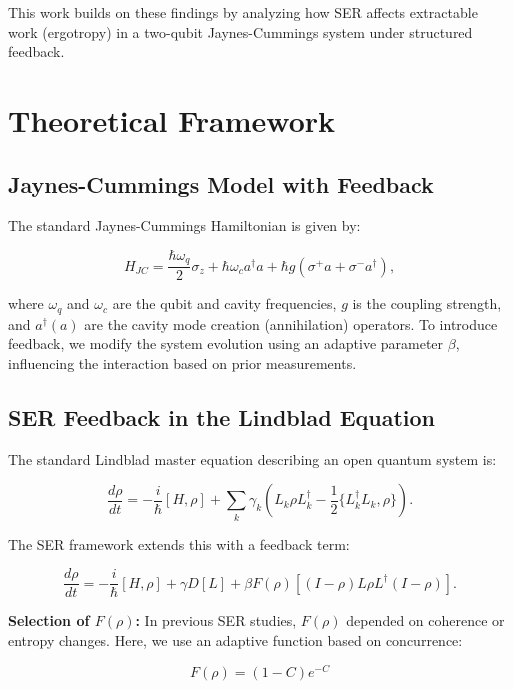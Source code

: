 \documentclass[12pt]{article}
\begin{document}
This work builds on these findings by analyzing how SER affects extractable work (ergotropy) in a two-qubit Jaynes-Cummings system under structured feedback.

\section{Theoretical Framework}

\subsection{Jaynes-Cummings Model with Feedback}
The standard Jaynes-Cummings Hamiltonian is given by:

\begin{equation}
H_{JC} = \frac{\hbar \omega_q}{2} \sigma_z + \hbar \omega_c a^\dagger a + \hbar g (\sigma^+ a + \sigma^- a^\dagger),
\end{equation}

where $\omega_q$ and $\omega_c$ are the qubit and cavity frequencies, $g$ is the coupling strength, and $a^\dagger (a)$ are the cavity mode creation (annihilation) operators. To introduce feedback, we modify the system evolution using an adaptive parameter $\beta$, influencing the interaction based on prior measurements.

\subsection{SER Feedback in the Lindblad Equation}
The standard Lindblad master equation describing an open quantum system is:

\begin{equation}
\frac{d\rho}{dt} = -\frac{i}{\hbar} [H, \rho] + \sum_k \gamma_k \left( L_k \rho L_k^\dagger - \frac{1}{2} \{ L_k^\dagger L_k, \rho \} \right).
\end{equation}

The SER framework extends this with a feedback term:

\begin{equation}
\frac{d\rho}{dt} = - \frac{i}{\hbar} [H, \rho] + \gamma D[L] + \beta F(\rho) \left[ (I - \rho) L \rho L^\dagger (I - \rho) \right].
\end{equation}

\textbf{Selection of $F(\rho)$:}  
In previous SER studies, $F(\rho)$ depended on coherence or entropy changes. Here, we use an adaptive function based on concurrence:

\begin{equation}
F(\rho) = (1 - C) e^{-C}
\end{equation}
\end{document}
